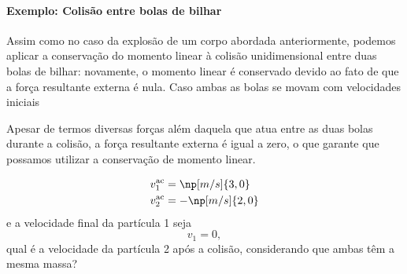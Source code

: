\paragraph{Exemplo: Colisão entre bolas de bilhar}

Assim como no caso da explosão de um corpo abordada anteriormente, podemos aplicar a conservação do momento linear à colisão unidimensional entre duas bolas de bilhar: novamente, o momento linear é conservado devido ao fato de que a força resultante externa é nula. Caso ambas as bolas se movam com velocidades iniciais
%
\begin{marginfigure}
\centering
{}
\caption{Apesar de termos diversas forças além daquela que atua entre as duas bolas durante a colisão, a força resultante externa é igual a zero, o que garante que possamos utilizar a conservação de momento linear.}
\end{marginfigure}
%
\begin{align}
    v_1^{\rm{ac}} &= \np[m/s]{3,0} \\
    v_2^{\rm{ac}} &= -\np[m/s]{2,0}
\end{align}
%
e a velocidade final da partícula 1 seja
\begin{equation}
    v_1 = 0,
\end{equation}
%
qual é a velocidade da partícula 2 após a colisão, considerando que ambas têm a mesma massa?

